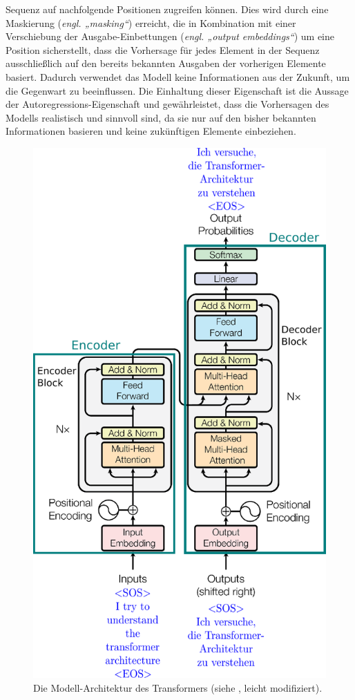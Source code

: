 Sequenz auf nachfolgende Positionen zugreifen können. Dies wird durch eine Maskierung (\emph{engl. „masking“}) erreicht, die in Kombination mit einer Verschiebung der Ausgabe-Einbettungen (\emph{engl. „output embeddings“}) um eine Position sicherstellt, dass die Vorhersage für jedes Element in der Sequenz ausschließlich auf den bereits bekannten Ausgaben der vorherigen Elemente basiert. Dadurch verwendet das Modell keine Informationen aus der Zukunft, um die Gegenwart zu beeinflussen. Die Einhaltung dieser Eigenschaft ist die Aussage der Autoregressions-Eigenschaft und gewährleistet, dass die Vorhersagen des Modells realistisch und sinnvoll sind, da sie nur auf den bisher bekannten Informationen basieren und keine zukünftigen Elemente einbeziehen.

\begin{figure}[htb]
	\centering
	\includegraphics[width=.5\textwidth]{figures/transformer_architecture}
	\caption{Die Modell-Architektur des Transformers (siehe \cite{Attention_is_all_you_need}, leicht modifiziert).}
	\label{Abb:transformer_architecture}
\end{figure}
